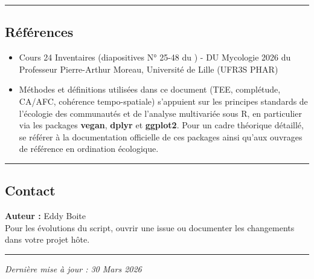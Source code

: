 \begin{center}\rule{0.5\linewidth}{0.5pt}\end{center}

\subsection{Références}\label{ruxe9fuxe9rences}

\begin{itemize}
\tightlist
\item
  Cours 24 Inventaires (diapositives N° 25-48 du ) - DU Mycologie 2026
  du Professeur Pierre-Arthur Moreau, Université de Lille (UFR3S PHAR)
\item
  Méthodes et définitions utilisées dans ce document (TEE, complétude,
  CA/AFC, cohérence tempo-spatiale) s'appuient sur les principes
  standards de l'écologie des communautés et de l'analyse multivariée
  sous R, en particulier via les packages \textbf{vegan}, \textbf{dplyr}
  et \textbf{ggplot2}. Pour un cadre théorique détaillé, se référer à la
  documentation officielle de ces packages ainsi qu'aux ouvrages de
  référence en ordination écologique.
\end{itemize}

\begin{center}\rule{0.5\linewidth}{0.5pt}\end{center}

\subsection{Contact}\label{contact}

\textbf{Auteur :} Eddy Boite\\
Pour les évolutions du script, ouvrir une issue ou documenter les
changements dans votre projet hôte.

\begin{center}\rule{0.5\linewidth}{0.5pt}\end{center}

\emph{Dernière mise à jour : 30 Mars 2026}
